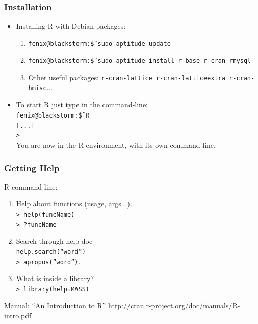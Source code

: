 \documentclass{beamer}
\begin{document}
\begin{frame}

\frametitle{Installation}
 \begin{itemize}
  \item Installing R with Debian packages:
  \begin{enumerate}
   \item \texttt{fenix@blackstorm:\~\$ sudo aptitude update}
   \item \texttt{fenix@blackstorm:\~\$ sudo aptitude install r-base r-cran-rmysql}
   \item Other useful packages: \texttt{r-cran-lattice r-cran-latticeextra r-cran-hmisc}...
  \end{enumerate}
   \item To start R just type in the command-line:\\
     \texttt{fenix@blackstorm:\~ \$ R}\\
     \texttt{[...]}\\
     \texttt{>}\\
    You are now in the R environment, with its own command-line.
 \end{itemize}

\end{frame}


\begin{frame}

\frametitle{Getting Help}
  R command-line:
  \begin{enumerate}
   \item Help about functions (usage, args...).\\
   \texttt{> help(funcName)}\\
   \texttt{> ?funcName} 
   \item Search through help doc\\
   \texttt{help.search(``word'')}\\
   \texttt{> apropos(''word'')}.
   \item What is inside a library?\\
   \texttt{> library(help=MASS)}
   \end{enumerate}
  Manual: ``An Introduction to R'' \url{http://cran.r-project.org/doc/manuals/R-intro.pdf}

\end{frame}

\end{document}

